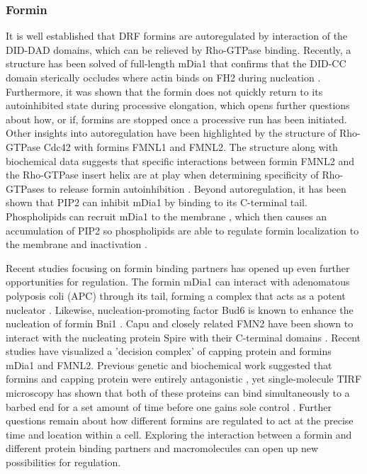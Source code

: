 \subsubsection{Formin}
It is well established that DRF formins are autoregulated by interaction of the DID-DAD domains, which can be relieved by Rho-GTPase binding. Recently, a structure has been solved of full-length mDia1 that confirms that the DID-CC domain sterically occludes where actin binds on FH2 during nucleation \citep{maiti_structure_2012}. Furthermore, it was shown that the formin does not quickly return to its autoinhibited state during processive elongation, which opens further questions about how, or if, formins are stopped once a processive run has been initiated. Other insights into autoregulation have been highlighted by the structure of Rho-GTPase Cdc42 with formins FMNL1 and FMNL2. The structure along with biochemical data suggests that specific interactions between formin FMNL2 and the Rho-GTPase insert helix are at play when determining specificity of Rho-GTPases to release formin autoinhibition \citep{kuhn_structure_2015}. Beyond autoregulation, it has been shown that PIP2 can inhibit mDia1 by binding to its C-terminal tail. Phospholipids can recruit mDia1 to the membrane \citep{van_gisbergen_class_2012}, which then causes an accumulation of PIP2 so phospholipids are able to regulate formin localization to the membrane and inactivation \citep{ramalingam_phospholipids_2010}. 

Recent studies focusing on formin binding partners has opened up even further opportunities for regulation. The formin mDia1 can interact with adenomatous polyposis coli (APC) through its tail, forming a complex that acts as a potent nucleator \citep{breitsprecher_rocket_2012,okada_adenomatous_2010}. Likewise, nucleation-promoting factor Bud6 is known to enhance the nucleation of formin Bni1 \citep{moseley_differential_2005}. Capu and closely related FMN2 have been shown to interact with the nucleating protein Spire with their C-terminal domains \citep{montaville_role_2016,montaville_spire_2014, pechlivanis_identification_2009,vizcarra_structure_2011}. Recent studies have visualized a 'decision complex' of capping protein and formins mDia1 and FMNL2. Previous genetic and biochemical work suggested that formins and capping protein were entirely antagonistic \citep{kovar_profilin-mediated_2005}, yet single-molecule TIRF microscopy has shown that both of these proteins can bind simultaneously to a barbed end for a set amount of time before one gains sole control \citep{bombardier_single-molecule_2015,shekhar_formin_2015}. Further questions remain about how different formins are regulated to act at the precise time and location within a cell. Exploring the interaction between a formin and different protein binding partners and macromolecules can open up new possibilities for regulation.

